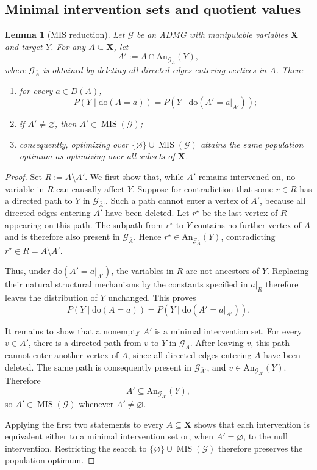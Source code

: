 \documentclass[twoside]{article}
\newtheorem{lemma}{Lemma}
\newcommand{\doo}{\mathrm{do}}
\newcommand{\An}{\mathrm{An}}
\begin{document}
\subsection{Minimal intervention sets and quotient values}
\begin{lemma}[MIS reduction]
\label{lem:mis-reduction}
Let $\mathcal G$ be an ADMG with manipulable variables $\mathbf X$
and target $Y$. For any $A\subseteq\mathbf X$, let
\[
  A'
  :=
  A\cap\An_{\mathcal G_{\bar A}}(Y),
\]
where $\mathcal G_{\bar A}$ is obtained by deleting all directed edges
entering vertices in $A$. Then:
\begin{enumerate}[label=(\roman*)]
  \item for every $a\in D(A)$,
  \[
    P\!\left(Y\mid\doo(A=a)\right)
    =
    P\!\left(Y\mid
      \doo\!\left(A'=a|_{A'}\right)\right);
  \]
  \item if $A'\ne\varnothing$, then
  $A'\in\operatorname{MIS}(\mathcal G)$;
  \item consequently, optimizing over
  $\{\varnothing\}\cup\operatorname{MIS}(\mathcal G)$ attains the same
  population optimum as optimizing over all subsets of $\mathbf X$.
\end{enumerate}
\end{lemma}


\begin{proof}
Set $R:=A\setminus A'$. We first show that, while $A'$ remains intervened on, no variable in $R$ can causally affect $Y$. Suppose for contradiction that some $r\in R$ has a directed path to $Y$ in $\mathcal G_{\bar A'}$. Such a path cannot enter a vertex of $A'$, because all directed edges entering $A'$ have been deleted. Let $r^\star$ be the last vertex of $R$ appearing on this path. The subpath from $r^\star$ to $Y$ contains no further vertex of $A$ and is therefore also present in $\mathcal G_{\bar A}$. Hence $r^\star\in\An_{\mathcal G_{\bar A}}(Y)$, contradicting $r^\star\in R=A\setminus A'$.

Thus, under $\doo(A'=a|_{A'})$, the variables in $R$ are not ancestors of $Y$. Replacing their natural structural mechanisms by the constants specified in $a|_R$ therefore leaves the distribution of $Y$ unchanged. This proves
\[
  P\!\left(Y\mid\doo(A=a)\right)
  =
  P\!\left(Y\mid
    \doo\!\left(A'=a|_{A'}\right)\right).
\]

It remains to show that a nonempty $A'$ is a minimal intervention set. For every $v\in A'$, there is a directed path from $v$ to $Y$ in $\mathcal G_{\bar A}$. After leaving $v$, this path cannot enter another vertex of $A$, since all directed edges entering $A$ have been deleted.
The same path is consequently present in $\mathcal G_{\bar A'}$, and
$v\in\An_{\mathcal G_{\bar A'}}(Y)$. Therefore
\[
  A'\subseteq\An_{\mathcal G_{\bar A'}}(Y),
\]
so $A'\in\operatorname{MIS}(\mathcal G)$ whenever $A'\ne\varnothing$.

Applying the first two statements to every $A\subseteq\mathbf X$ shows that each intervention is equivalent either to a minimal intervention set or, when $A'=\varnothing$, to the null intervention. Restricting the search to $\{\varnothing\}\cup\operatorname{MIS}(\mathcal G)$ therefore preserves the population optimum.
\end{proof}
\end{document}

